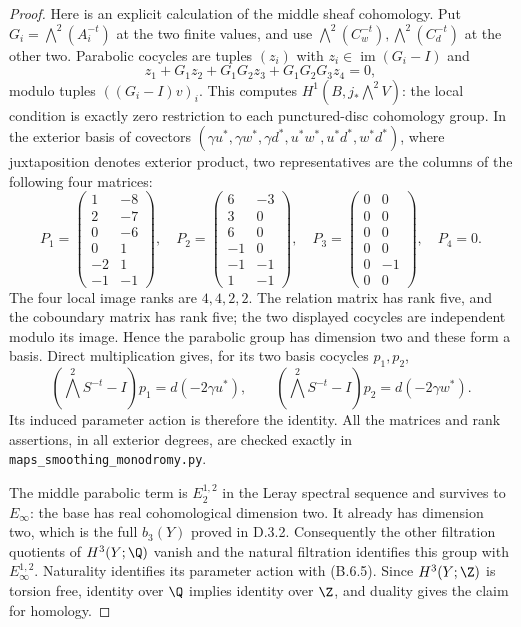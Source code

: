 \begin{proof}
Here is an explicit calculation of the middle sheaf cohomology. Put
$G_i=\bigwedge^2(A_i^{-t})$ at the two finite values, and use
$\bigwedge^2(C_w^{-t}),\bigwedge^2(C_d^{-t})$ at the other two.
Parabolic cocycles are tuples $(z_i)$ with
$z_i\in\operatorname{im}(G_i-I)$ and
\[
 z_1+G_1z_2+G_1G_2z_3+G_1G_2G_3z_4=0,
\]
modulo tuples $((G_i-I)v)_i$. This computes
$H^1(B,j_*\bigwedge^2V)$: the local condition is exactly zero
restriction to each punctured-disc cohomology group.
In the exterior basis of covectors
$(\gamma u^*,\gamma w^*,\gamma d^*,u^*w^*,u^*d^*,w^*d^*)$,
where juxtaposition denotes exterior product, two representatives
are the columns of the following four matrices:
\[
 P_1=\begin{pmatrix}1&-8\\2&-7\\0&-6\\0&1\\-2&1\\-1&-1\end{pmatrix},
 \quad
 P_2=\begin{pmatrix}6&-3\\3&0\\6&0\\-1&0\\-1&-1\\1&-1\end{pmatrix},
 \quad
 P_3=\begin{pmatrix}0&0\\0&0\\0&0\\0&0\\0&-1\\0&0\end{pmatrix},
 \quad P_4=0.
 \tag{B.6.4}
\]
The four local image ranks are $4,4,2,2$. The relation matrix
has rank five, and the coboundary matrix has rank five; the two
displayed cocycles are independent modulo its image. Hence the
parabolic group has dimension two and these form a basis. Direct
multiplication gives, for its two basis cocycles $p_1,p_2$,
\[
 (\bigwedge^2S^{-t}-I)p_1=d(-2\gamma u^*),\qquad
 (\bigwedge^2S^{-t}-I)p_2=d(-2\gamma w^*).
 \tag{B.6.5}
\]
Its induced parameter action is therefore the identity. All the
matrices and rank assertions, in all exterior degrees, are checked
exactly in \texttt{maps\_smoothing\_monodromy.py}.

The middle parabolic term is $E_2^{1,2}$ in the Leray spectral
sequence and survives to $E_\infty$: the base has real cohomological
dimension two. It already has dimension two, which is the full
$b_3(Y)$ proved in D.3.2. Consequently the other filtration quotients
of $H^3(Y;\Q)$ vanish and the natural filtration identifies this
group with $E_\infty^{1,2}$. Naturality identifies its parameter
action with (B.6.5). Since $H^3(Y;\Z)$ is torsion free, identity
over $\Q$ implies identity over $\Z$, and duality gives the claim
for homology.
\end{proof}

